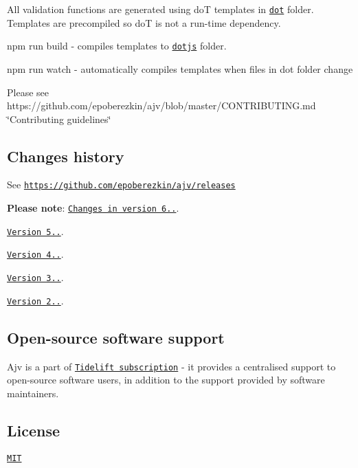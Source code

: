 All validation functions are generated using doT templates in \href{https://github.com/epoberezkin/ajv/tree/master/lib/dot}{\tt dot} folder. Templates are precompiled so doT is not a run-\/time dependency.

{\ttfamily npm run build} -\/ compiles templates to \href{https://github.com/epoberezkin/ajv/tree/master/lib/dotjs}{\tt dotjs} folder.

{\ttfamily npm run watch} -\/ automatically compiles templates when files in dot folder change

Please see https\+://github.com/epoberezkin/ajv/blob/master/\+C\+O\+N\+T\+R\+I\+B\+U\+T\+I\+N\+G.\+md \char`\"{}\+Contributing guidelines\char`\"{}

\subsection*{Changes history}

See \href{https://github.com/epoberezkin/ajv/releases}{\tt https\+://github.\+com/epoberezkin/ajv/releases}

{\bfseries Please note}\+: \href{https://github.com/epoberezkin/ajv/releases/tag/v6.0.0}{\tt Changes in version 6..}.

\href{https://github.com/epoberezkin/ajv/releases/tag/5.0.0}{\tt Version 5..}.

\href{https://github.com/epoberezkin/ajv/releases/tag/4.0.0}{\tt Version 4..}.

\href{https://github.com/epoberezkin/ajv/releases/tag/3.0.0}{\tt Version 3..}.

\href{https://github.com/epoberezkin/ajv/releases/tag/2.0.0}{\tt Version 2..}.

\subsection*{Open-\/source software support}

Ajv is a part of \href{https://tidelift.com/subscription/pkg/npm-ajv?utm_source=npm-ajv&utm_medium=referral&utm_campaign=readme}{\tt Tidelift subscription} -\/ it provides a centralised support to open-\/source software users, in addition to the support provided by software maintainers.

\subsection*{License}

\href{https://github.com/epoberezkin/ajv/blob/master/LICENSE}{\tt M\+IT} 